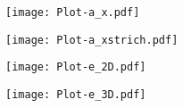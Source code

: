 

\pagestyle{empty}



\texttt{[image: Plot-a\_x.pdf]}

\texttt{[image: Plot-a\_xstrich.pdf]}

\texttt{[image: Plot-e\_2D.pdf]}

\texttt{[image: Plot-e\_3D.pdf]}




